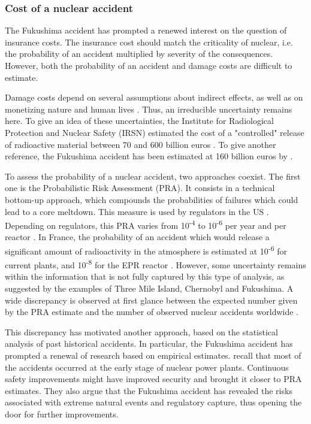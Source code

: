 \subsubsection{Cost of a nuclear accident}
\label{ssec:accident}

The Fukushima accident has prompted a renewed interest on the question of insurance costs. The insurance cost should match the criticality of nuclear, i.e. the probability of an accident multiplied by severity of the consequences. However, both the probability of an accident and damage costs are difficult to estimate.

Damage costs depend on several assumptions about indirect effects, as well as on monetizing nature and human lives \citep{Gadrey2016}. Thus, an irreducible uncertainty remains here. To give an idea of these uncertainties, the Institute for Radiological Protection and Nuclear Safety (IRSN) estimated the cost of a "controlled" release of radioactive material between 70 and 600 billion euros \citep{CourdesComptes2012}. To give another reference, the Fukushima accident has been estimated at 160 billion euros by \citet{MunichRe2013}.

To assess the probability of a nuclear accident, two approaches coexist. The first one is the Probabilistic Risk Assessment (PRA). It consists in a technical bottom-up approach, which compounds the probabilities of failures which could lead to a core meltdown. This measure is used by regulators in the US \citep{Kadak2007}. Depending on regulators, this PRA varies from 10\textsuperscript{-4} to 10\textsuperscript{-6} per year and per reactor \citep{Ha-Duong2014}. In France, the probability of an accident which would release a significant amount of radioactivity in the atmosphere is estimated at 10\textsuperscript{-6} for current plants, and 10\textsuperscript{-8} for the EPR reactor \citep{CourdesComptes2012}. However, some uncertainty remains within the information that is not fully captured by this type of analysis, as suggested by the examples of Three Mile Island, Chernobyl and Fukushima. A wide discrepancy is observed at first glance between the expected number given by the PRA estimate and the number of observed nuclear accidents worldwide \citep{Ha-Duong2014}. 

This discrepancy has motivated another approach, based on the statistical analysis of past historical accidents. In particular, the Fukushima accident has prompted a renewal of research based on empirical estimates. \citet{Rangel2014} recall that most of the accidents occurred at the early stage of nuclear power plants. Continuous safety improvements might have improved security and brought it closer to PRA estimates. They also argue that the Fukushima accident has revealed the risks associated with extreme natural events and regulatory capture, thus opening the door for further improvements.

